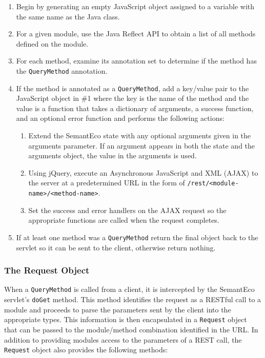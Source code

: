 \documentclass[letterpaper]{report}
\begin{document}
\begin{enumerate}
\item Begin by generating an empty JavaScript object assigned to a variable with the same name as the Java class.
\item For a given module, use the Java Reflect API to obtain a list of all methods defined on the module.
\item For each method, examine its annotation set to determine if the method has the \texttt{QueryMethod} annotation.
\item If the method is annotated as a \texttt{QueryMethod}, add a key/value pair to the JavaScript object in \#1 where the key is the name of the method and the value is a function that takes a dictionary of arguments, a success function, and an optional error function and performs the following actions:
\begin{enumerate}
\item Extend the SemantEco state with any optional arguments given in the arguments parameter. If an argument appears in both the state and the arguments object, the value in the arguments is used.
\item Using jQuery, execute an Asynchronous JavaScript and XML (AJAX) to the server at a predetermined URL in the form of \texttt{/rest/<module-name>/<method-name>}.
\item Set the success and error handlers on the AJAX request so the appropriate functions are called when the request completes.
\end{enumerate}
\item If at least one method was a \texttt{QueryMethod} return the final object back to the servlet so it can be sent to the client, otherwise return nothing.
\end{enumerate}

\subsubsection{The Request Object}
\label{request-object}
When a \texttt{QueryMethod} is called from a client, it is intercepted by the SemantEco servlet's \texttt{doGet} method. This method identifies the request as a RESTful call to a module and proceeds to parse the parameters sent by the client into the appropriate types. This information is then encapsulated in a \texttt{Request} object that can be passed to the module/method combination identified in the URL. In addition to providing modules access to the parameters of a REST call, the \texttt{Request} object also provides the following methods:
\end{document}
